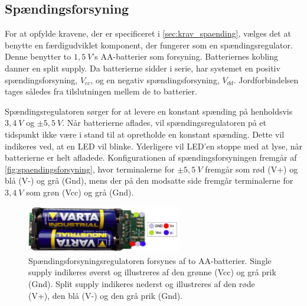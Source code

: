 \subsection{Spændingsforsyning}
For at opfylde kravene, der er specificeret i \autoref{sec:krav_spaending}, vælges det at benytte en færdigudviklet komponent, der fungerer som en spændingsregulator. 
Denne benytter to $1,5~V$'s AA-batterier som forsyning. 
Batteriernes kobling danner en split supply. 
Da batterierne sidder i serie, har systemet en positiv spændingsforsyning, ${V}_{cc}$, og en negativ spændingsforsyning, ${V}_{dd}$. 
Jordforbindelsen tages således fra tilslutningen mellem de to batterier.

Spændingsregulatoren sørger for at levere en konstant spænding på henholdsvis $3,4~V$ og $\pm 5,5~V$.
Når batterierne aflades, vil spændingsregulatoren på et tidspunkt ikke være i stand til at opretholde en konstant spænding. 
Dette vil indikeres ved, at en LED vil blinke. 
Yderligere vil LED'en stoppe med at lyse, når batterierne er helt afladede. 
Konfigurationen af spændingsforsyningen fremgår af \autoref{fig:spaendingsforsyning}, hvor terminalerne for $\pm 5,5~V$ fremgår som rød (V+) og blå (V-) og grå (Gnd), mens der på den modsatte side fremgår terminalerne for $3,4~V$ som grøn (Vcc) og grå (Gnd). 

\begin{figure}[H]
\centering
\includegraphics[width=0.6\textwidth]{figures/spaendingsforsyning}
\caption{Spændingsforsyningsregulatoren forsynes af to AA-batterier. Single supply indikeres øverst og illustreres af den grønne (Vcc) og grå prik (Gnd). Split supply indikeres nederst og illustreres af den røde (V+), den blå (V-) og den grå prik (Gnd).}
\label{fig:spaendingsforsyning}
\end{figure}

